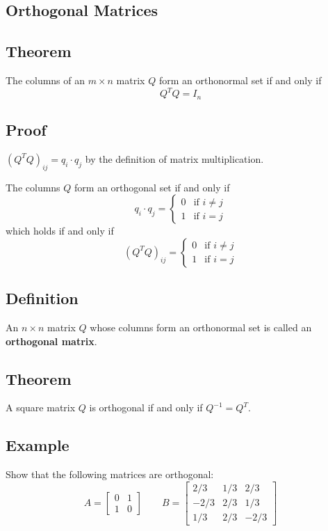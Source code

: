 \subsection*{Orthogonal Matrices}

\subsection*{Theorem}
The columns of an $m\times n$ matrix $Q$ form an orthonormal set if and only if
\[Q^TQ=I_n\]

\subsection*{Proof}
$(Q^TQ)_{ij}=q_i\cdot q_j$ by the definition of matrix multiplication.

The columns $Q$ form an orthogonal set if and only if
\[q_i\cdot q_j=\begin{cases}
        0 & \text{if } i\neq j \\
        1 & \text{if } i=j
    \end{cases}\]
which holds if and only if
\[(Q^TQ)_{ij}=\begin{cases}
        0 & \text{if } i\neq j \\
        1 & \text{if } i=j
    \end{cases}\]

\subsection*{Definition}
An $n\times n$ matrix $Q$ whose columns form an orthonormal set is called an
\textbf{orthogonal matrix}.

\subsection*{Theorem}
A square matrix $Q$ is orthogonal if and only if $Q^{-1}=Q^T$.

\subsection*{Example}
Show that the following matrices are orthogonal:
\[
    A=\begin{bmatrix}
        0 & 1 \\
        1 & 0
    \end{bmatrix} \qquad
    B=\begin{bmatrix}
        2/3  & 1/3 & 2/3  \\
        -2/3 & 2/3 & 1/3  \\
        1/3  & 2/3 & -2/3
    \end{bmatrix}
\]

